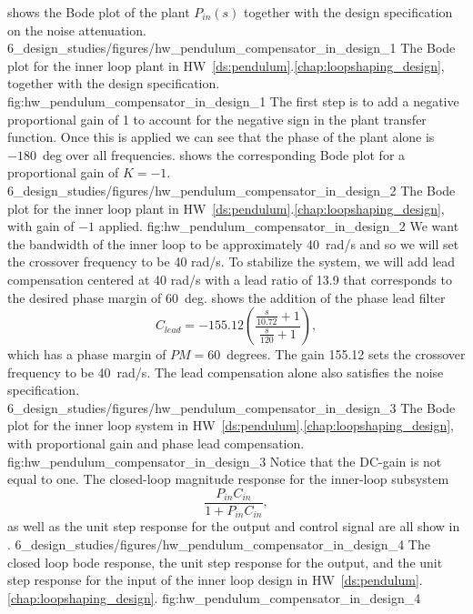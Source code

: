  shows the Bode plot of the plant $P_{in}(s)$ together with the design specification on the noise attenuation.
%
	{6_design_studies/figures/hw_pendulum_compensator_in_design_1}
	{The Bode plot for the inner loop plant in HW~\ref{ds:pendulum}.\ref{chap:loopshaping_design}, together with the design specification.}
	{fig:hw_pendulum_compensator_in_design_1}
The first step is to add a negative proportional gain of 1 to account for the negative sign in the plant transfer function. Once this is applied we can see that the phase of the plant alone is $-180$~deg over all frequencies. %
 shows the corresponding Bode plot for a proportional gain of $K=-1$.
	{6_design_studies/figures/hw_pendulum_compensator_in_design_2}
	{The Bode plot for the inner loop plant in HW~\ref{ds:pendulum}.\ref{chap:loopshaping_design}, with gain of $-1$ applied.}
	{fig:hw_pendulum_compensator_in_design_2}
We want the bandwidth of the inner loop to be approximately 40~rad/s and so we will set the crossover frequency to be 40 rad/s. To stabilize the system, we will add lead compensation centered at 40 rad/s with a lead ratio of 13.9 that corresponds to the desired phase margin of 60~deg.   shows the addition of the phase lead filter
\[
C_{lead} = -155.12\left( \frac{\frac{s}{10.72}+1}{\frac{s}{120}+1} \right),
\]
which has a phase margin of $PM=60$~degrees. The gain 155.12 sets the crossover frequency to be 40~rad/s. The lead compensation alone also satisfies the noise specification.
	{6_design_studies/figures/hw_pendulum_compensator_in_design_3}
	{The Bode plot for the inner loop system in HW~\ref{ds:pendulum}.\ref{chap:loopshaping_design}, with proportional gain and phase lead compensation.}
	{fig:hw_pendulum_compensator_in_design_3}
Notice that the DC-gain is not equal to one.
The closed-loop magnitude response for the inner-loop subsystem
\[
\frac{P_{in}C_{in}}{1+P_{in}C_{in}},
\] 
as well as the unit step response for the output and control signal are all show in .
	{6_design_studies/figures/hw_pendulum_compensator_in_design_4}
	{The closed loop bode response, the unit step response for the output, and the unit step response for the input of the inner loop design in HW~\ref{ds:pendulum}.\ref{chap:loopshaping_design}.}
	{fig:hw_pendulum_compensator_in_design_4}

